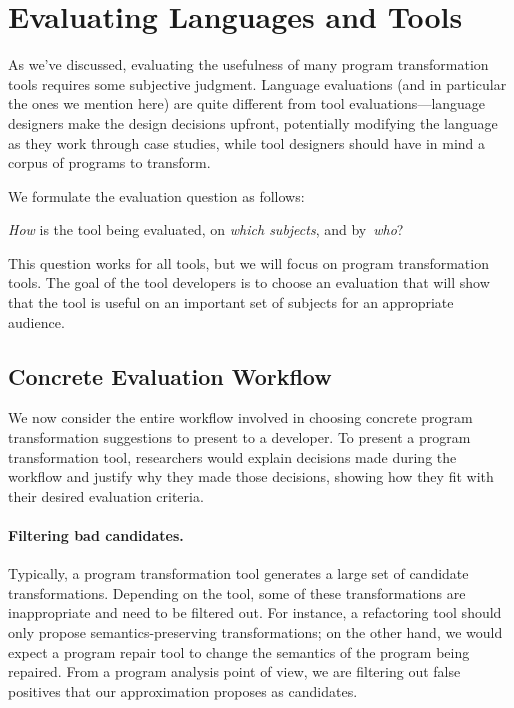 \section{Evaluating Languages and Tools}
\label{sec:how-to-evaluate}
As we've discussed, evaluating the usefulness of many program
transformation tools requires some subjective judgment. 
Language evaluations (and in particular the ones we mention here) are
quite different from tool evaluations---language designers make
the design decisions upfront, potentially modifying the language
as they work through case studies, while tool designers should have
in mind a corpus of programs to transform.

We formulate the evaluation question as follows:
\begin{center}
\emph{How} is the tool being evaluated, on \emph{which subjects},
and by~\emph{who}?
\end{center}
This question works for all tools, but we will focus on program
transformation tools. The goal of the tool developers is to choose
an evaluation that will show that the tool is useful on an important
set of subjects for an appropriate audience.

\subsection{Concrete Evaluation Workflow}
We now consider the entire workflow involved in choosing concrete
program transformation suggestions to present to a developer. To present
a program transformation tool, researchers would explain decisions made during
the workflow and justify why they made those decisions, showing how they fit
with their
desired evaluation criteria.

\paragraph{Filtering bad candidates.} Typically, a
program transformation tool generates a large set of candidate
transformations. Depending on the tool, some of these transformations
are inappropriate and need to be filtered out. For instance, a
refactoring tool should only propose semantics-preserving
transformations; on the other hand, we would expect a program repair
tool to change the semantics of the program being repaired.
From a program analysis point of view, we are filtering out false
positives that our approximation proposes as candidates.

